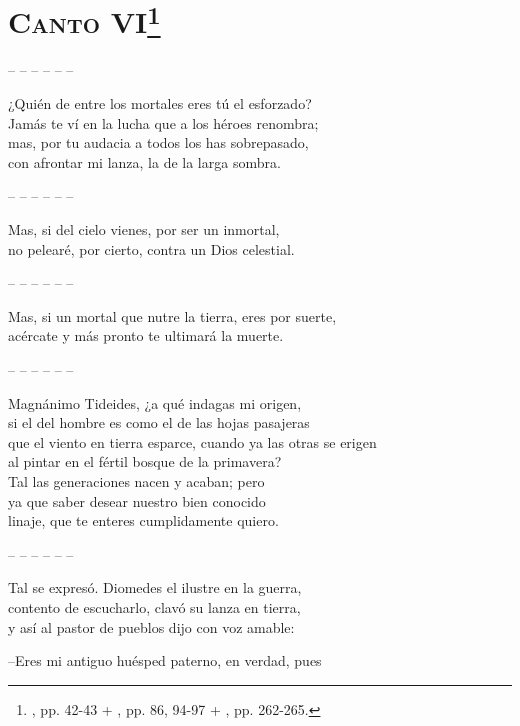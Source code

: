 \section*{\centering\textbf{\textsc{Canto} VI}\footnote{\ehuno, pp. 42-43 + \ehdos, pp. 86, 94-97 + \ehctr, pp. 262-265.}}
%
\beginnumbering
\noindent-- -- -- -- -- --\par
\pstart
{}
¿Quién de entre los mortales eres tú el esforzado?\\
Jamás te ví en la lucha que a los héroes renombra;\\
mas, por tu audacia a todos los has sobrepasado,\\
con afrontar mi lanza, la de la larga sombra.\par
\pend
\noindent-- -- -- -- -- --\par
%
\pstart
{}
Mas, si del cielo vienes, por ser un inmortal,\\
no pelearé, por cierto, contra un Dios celestial.\par
\pend
\noindent-- -- -- -- -- --\par
%
\pstart
{}
Mas, si un mortal que nutre la tierra, eres por suerte,\\
acércate y más pronto te ultimará la muerte.\par
\pend
\noindent-- -- -- -- -- --\par
%
\pstart
{}
Magnánimo Tideides, ¿a qué indagas mi origen,\\
si el del hombre es como el de las hojas pasajeras\\
que el viento en tierra esparce, cuando ya las otras se erigen\\
al pintar en el fértil bosque de la primavera?\\
Tal las generaciones nacen y acaban; pero\\
ya que saber desear nuestro bien conocido\\
linaje, que te enteres cumplidamente quiero.\par
\pend
\noindent-- -- -- -- -- --\par
%
\pstart
{}
Tal se expresó. Diomedes el ilustre en la guerra,\\
contento de escucharlo, clavó su lanza en tierra,\\
y así al pastor de pueblos dijo con voz amable:\par
--Eres mi antiguo huésped paterno, en verdad, pues\\
